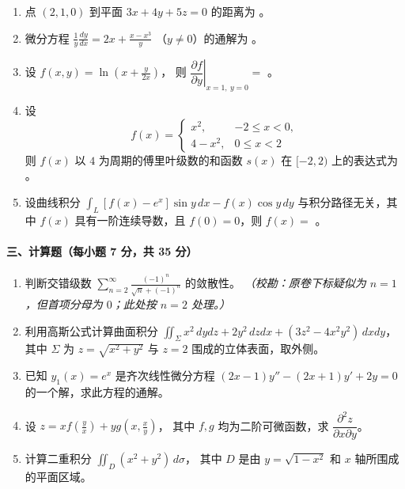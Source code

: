 \begin{enumerate}
  \item 点 $(2,1,0)$ 到平面 $3x+4y+5z=0$ 的距离为 \underline{\hspace{4cm}}。

  \item 微分方程 \(\displaystyle \frac{1}{y}\frac{dy}{dx}=2x+\frac{x-x^3}{y}\)
  （$y\ne0$）的通解为 \underline{\hspace{4cm}}。

  \item 设 \(\displaystyle f(x,y)=\ln\left(x+\frac{y}{2x}\right)\)，
  则 $\left.\dfrac{\partial f}{\partial y}\right|_{x=1,\ y=0}=$ \underline{\hspace{4cm}}。

  \item 设
  \[
    f(x)=
    \begin{cases}
      x^2, & -2\le x<0,\\
      4-x^2, & 0\le x<2
    \end{cases}
  \]
  则 $f(x)$ 以 $4$ 为周期的傅里叶级数的和函数 $s(x)$ 在 $[-2,2)$ 上的表达式为 \underline{\hspace{4cm}}。

  \item 设曲线积分 \(\displaystyle \int_L [f(x)-e^x]\sin y\,dx-f(x)\cos y\,dy\)
  与积分路径无关，其中 $f(x)$ 具有一阶连续导数，且 $f(0)=0$，则 $f(x)=$ \underline{\hspace{4cm}}。
\end{enumerate}

\paragraph*{三、计算题（每小题 7 分，共 35 分）}

\begin{enumerate}
  \item 判断交错级数 \(\displaystyle \sum_{n=2}^{\infty}\frac{(-1)^n}{\sqrt n+(-1)^n}\)
  的敛散性。
  \textit{（校勘：原卷下标疑似为 $n=1$，但首项分母为 $0$；此处按 $n=2$ 处理。）}

  \item 利用高斯公式计算曲面积分 \(\displaystyle \iint_{\Sigma}x^2\,dydz+2y^2\,dzdx+(3z^2-4x^2y^2)\,dxdy\)，
  其中 $\Sigma$ 为 $z=\sqrt{x^2+y^2}$ 与 $z=2$ 围成的立体表面，取外侧。

  \item 已知 $y_1(x)=e^x$ 是齐次线性微分方程 \(\displaystyle (2x-1)y''-(2x+1)y'+2y=0\)
  的一个解，求此方程的通解。

  \item 设 \(\displaystyle z=xf\left(\frac{y}{x}\right)+yg\left(x,\frac{x}{y}\right)\)，
  其中 $f,g$ 均为二阶可微函数，求 $\dfrac{\partial^2 z}{\partial x\partial y}$。

  \item 计算二重积分 \(\displaystyle \iint_D (x^2+y^2)\,d\sigma\)，
  其中 $D$ 是由 $y=\sqrt{1-x^2}$ 和 $x$ 轴所围成的平面区域。
\end{enumerate}

